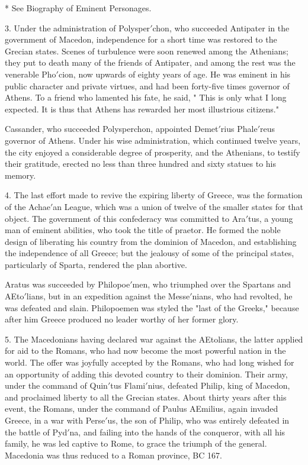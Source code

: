 \documentclass[openany,a4paper]{memoir}
\begin{document}
* See Biography of Eminent Personages. 


3. Under the administration of Polysper$'$chon, who succeeded Antipater in the government of Macedon, independence for a short time was restored to the Grecian states. 
Scenes of turbulence were soon renewed among the Athenians; they put to death many of the friends of Antipater, 
and among the rest was the venerable Pho$'$cion, now upwards 
of eighty years of age. He was eminent in his public character and private virtues, and had been forty-five times governor of Athens. To a friend who lamented his fate, he said, 
" This is only what I long expected. It is thus that Athens 
has rewarded her most illustrious citizens." 

Cassander, who succeeded Polysperchon, appointed Demet$'$rius Phale$'$reus governor of Athens. Under his wise 
administration, which continued twelve years, the city enjoyed a considerable degree of prosperity, and the Athenians, 
to testify their gratitude, erected no less than three hundred 
and sixty statues to his memory. 

4. The last effort made to revive the expiring liberty of 
Greece, was the formation of the Achae$'$an League, which 
was a union of twelve of the smaller states for that object. The 
government of this confederacy was committed to Ara$'$tus, a 
young man of eminent abilities, who took the title of praetor. 
He formed the noble design of liberating his country from 
the dominion of Macedon, and establishing the independence 
of all Greece; but the jealousy of some of the principal 
states, particularly of Sparta, rendered the plan abortive. 

Aratus was succeeded by Philopoe$'$men, who triumphed over 
the Spartans and AEto$'$lians, but in an expedition against the 
Messe$'$nians, who had revolted, he was defeated and slain. 
Philopoemen was styled the "last of the Greeks," because 
after him Greece produced no leader worthy of her former 
glory. 

5. The Macedonians having declared war against the AEtolians, the latter applied for aid to the Romans, who had now 
become the most powerful nation in the world. The offer 
was joyfully accepted by the Romans, who had long wished 
for an opportunity of adding this devoted country to their 
dominion. Their army, under the command of Quin$'$tus 
Flami$'$nius, defeated Philip, king of Macedon, and proclaimed 
liberty to all the Grecian states. About thirty years after this 
event, the Romans, under the command of Paulus AEmilius, 
again invaded Greece, in a war with Perse$'$us, the son of 
Philip, who was entirely defeated in the battle of Pyd$'$na, 
and failing into the hands of the conqueror, with all his family, 
he was led captive to Rome, to grace the triumph of the 
general. Macedonia was thus reduced to a Roman province, 
BC 167. 
\end{document}
